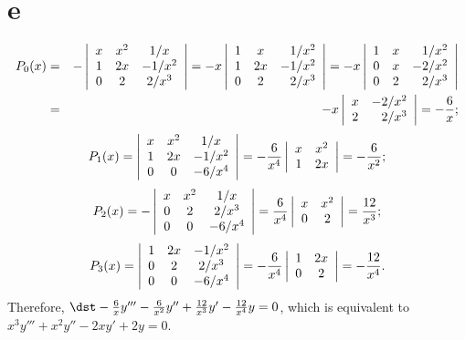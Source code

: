 \documentclass[dvips]{book}
\numberwithin{example}{section}
\numberwithin{equation}{section}
\numberwithin{theorem}{section}
\numberwithin{table}{section}
\numberwithin{figure}{section}
\begin{document}
\part{e}
\begin{eqnarray*}
P_0(x)&=&
-\left|\begin{array}{ccc}
x&x^2&1/x\\
1&2x&-1/x^2\\
0&2&2/x^3
\end{array}\right|=
-x\left|\begin{array}{ccr}
1&x&1/x^2\\
1&2x&-1/x^2\\
0&2&2/x^3
\end{array}\right|=
-x\left|\begin{array}{ccr}
1&x&1/x^2\\
0&x&-2/x^2\\
0&2&2/x^3
\end{array}\right|\\
&=&-x\left|\begin{array}{cr}
x&-2/x^2\\
2&2/x^3
\end{array}\right|=-{6\over x};
\end{eqnarray*}
$$
P_1(x)=
\left|\begin{array}{ccc}
x&x^2&1/x\\
1&2x&-1/x^2\\
0&0&-6/x^4
\end{array}\right|=
-{6\over x^4}\left|\begin{array}{ccc}
x&x^2\\
1&2x
\end{array}\right|=-{6\over x^2};
$$
$$
P_2(x)=
-\left|\begin{array}{ccc}
x&x^2&1/x\\
0&2&2/x^3\\
0&0&-6/x^4
\end{array}\right|=
{6\over x^4}\left|\begin{array}{ccc}
x&x^2\\
0&2\\
\end{array}\right|={12\over x^3};
$$
$$
P_3(x)=
\left|\begin{array}{ccc}
1&2x&-1/x^2\\
0&2&2/x^3\\
0&0&-6/x^4
\end{array}\right|=
-{6\over x^4}\left|\begin{array}{ccc}
1&2x\\
0&2\\
\end{array}\right|=-{12\over x^4}.
$$
Therefore,
$\dst-{6\over x}y'''-{6\over x^2}y''+{12\over x^3}y'-{12\over
x^4}y=0$,
which is equivalent to $x^3y'''+x^2y''-2xy'+2y=0$.
\end{document}
